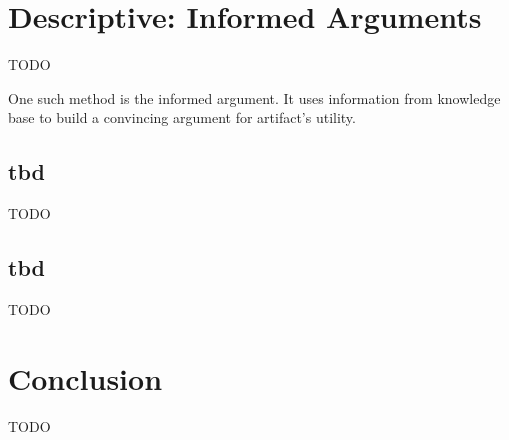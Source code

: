 \section{Descriptive: Informed Arguments}

TODO



One such method is the informed argument. It uses information from knowledge base to build a convincing argument for artifact’s utility.
\cite{Hevner2010}



\subsection{tbd}

TODO





\subsection{tbd}

TODO





\section{Conclusion}

TODO






